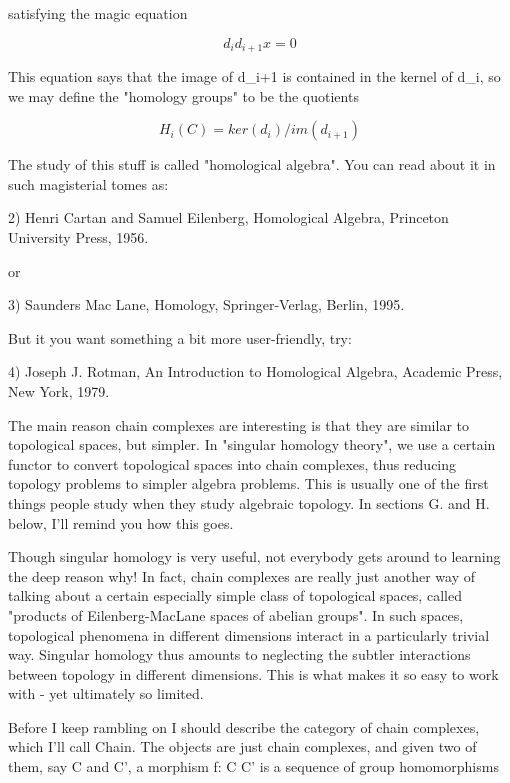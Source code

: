 satisfying the magic equation

$$

                        d_{i} d_{i+1} x = 0
$$
    
This equation says that the image of d_{i+1} is contained
in the kernel of d_{i}, so we may define the "homology groups" to be the
quotients


$$

                 H_{i}(C) = ker(d_{i}) / im(d_{i+1})   
$$
    
The study of this stuff is called "homological algebra".  You can read 
about it in such magisterial tomes as:

2) Henri Cartan and Samuel Eilenberg, Homological Algebra, Princeton
University Press, 1956.

or 

3) Saunders Mac Lane, Homology, Springer-Verlag, Berlin, 1995.

But it you want something a bit more user-friendly, try:

4) Joseph J. Rotman, An Introduction to Homological Algebra, 
Academic Press, New York, 1979.

The main reason chain complexes are interesting is that they are similar
to topological spaces, but simpler.  In "singular homology theory", we
use a certain functor to convert topological spaces into chain
complexes, thus reducing topology problems to simpler algebra problems.
This is usually one of the first things people study when they study
algebraic topology.  In sections G. and H. below, I'll remind you how
this goes.

Though singular homology is very useful, not everybody gets around to
learning the deep reason why!  In fact, chain complexes are really just 
another way
of talking about a certain especially simple class of topological spaces, called
"products of Eilenberg-MacLane spaces of abelian groups".  In such
spaces, topological phenomena in different dimensions interact in a
particularly trivial way.  Singular homology thus amounts to neglecting
the subtler interactions between topology in different dimensions.  This
is what makes it so easy to work with - yet ultimately so limited.
 
Before I keep rambling on I should describe the category of chain
complexes, which I'll call Chain.  The objects are just chain complexes,
and given two of them, say C and C', a morphism f: C \to  C' is a sequence
of group homomorphisms 

$$

